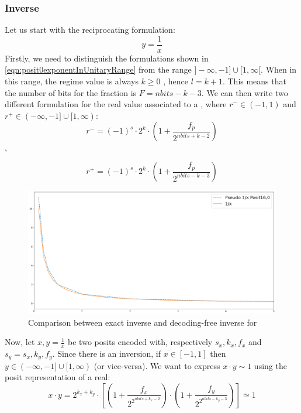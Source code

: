 \subsubsection{Inverse}
 
Let us start with the reciprocating formulation:
\begin{equation}
    y = \frac{1}{x}
\end{equation}
Firstly, we need to distinguish the formulations shown in \eqref{eqn:posit0exponentInUnitaryRange} from the range  $]-\infty,-1] \cup [1,\infty[$. When in this range, the regime value is always $k \geq 0$ ,  hence $l = k + 1$. This means that the number of bits for the fraction is $F = nbits - k - 3$. We can then write two different formulation for the real value associated to a , where $r^- \in (-1,1)$ and $r^+ \in (-\infty, -1] \cup [1,\infty)$:
\begin{equation}
   r^- =  (-1)^s \cdot 2^k \cdot \left ( 1 + \frac{f_p}{2^{nbits + k - 2}} \right )
\end{equation},

\begin{equation}
   r^+ = (-1)^s \cdot 2^k \cdot \left ( 1 + \frac{f_p}{2^{nbits - k - 3}} \right )
\end{equation}
\begin{figure}
    \centering
    \includegraphics[width=\linewidth]{img/invPosit160.png}
    \caption{Comparison between exact inverse and decoding-free inverse for }
    \label{fig:invPosit160}
\end{figure}
Now, let $x, y = \frac{1}{x}$ be two posits encoded with, respectively $s_x,k_x, f_x$ and $s_y = s_x, k_y, f_y$. Since there is an inversion, if $x \in [-1,1]$ then $y \in (-\infty, -1] \cup [1,\infty)$ (or vice-versa). We want to express $x \cdot y \sim 1$ using the posit representation of a real:
\begin{equation}\label{eqn:positx0prodInverse}
    x \cdot y = 2^{k_x+k_y} \cdot \left[ \left (1 + \frac{f_x}{2^{2^{nbits + k_x - 2}}} \right ) \cdot \left (1 + \frac{f_y}{2^{2^{nbits - k_y - 3}}} \right ) \right] \simeq 1
\end{equation}

